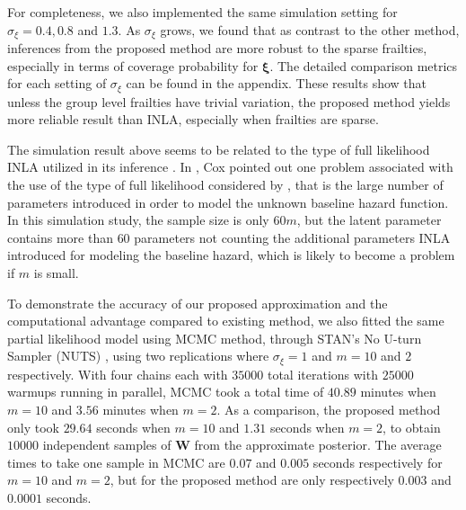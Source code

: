 \documentclass[ba]{imsart}
\begin{document}
For completeness, we also implemented the same simulation setting for $\sigma_\xi = 0.4, 0.8$ and $1.3$. As $\sigma_\xi$ grows, we found that as contrast to the other method, inferences from the proposed method are more robust to the sparse frailties, especially in terms of coverage probability for $\boldsymbol{\xi}$. The detailed comparison metrics for each setting of $\sigma_\xi$ can be found in the appendix. These results show that unless the group level frailties have trivial variation, the proposed method yields more reliable result than INLA, especially when frailties are sparse.

The simulation result above seems to be related to the type of full likelihood INLA utilized in its inference \citep{inlacoxph}. In \cite{coxdiscussion}, Cox pointed out one problem associated with the use of the type of full likelihood considered by \cite{inlacoxph}, that is the large number of parameters introduced in order to model the unknown baseline hazard function. In this simulation study, the sample size is only $60m$, but the latent parameter contains more than $60$ parameters not counting the additional parameters INLA introduced for modeling the baseline hazard, which is likely to become a problem if $m$ is small. 

To demonstrate the accuracy of our proposed approximation and the computational advantage compared to existing method, we also fitted the same partial likelihood model using MCMC method, through STAN's No U-turn Sampler (NUTS) \citep{NUTS}, using two replications where $\sigma_\xi = 1$ and $m = 10$ and $2$ respectively. With four chains each with $35000$ total iterations with $25000$ warmups running in parallel, MCMC took a total time of $40.89$ minutes when $m = 10$ and $3.56$ minutes when $m = 2$. As a comparison, the proposed method only took $29.64$ seconds when $m = 10$ and $1.31$ seconds when $m = 2$, to obtain $10000$ independent samples of $\boldsymbol{W}$ from the approximate posterior. The average times to take one sample in MCMC are $0.07$ and $0.005$ seconds respectively for $m = 10$ and $m = 2$, but for the proposed method are only respectively $0.003$ and $0.0001$ seconds.
\end{document}
